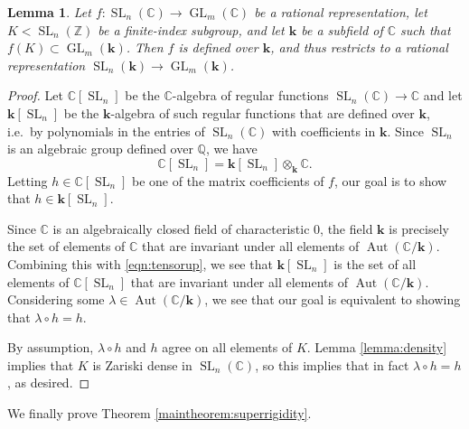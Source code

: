 \documentclass[11pt]{article}
\numberwithin{equation}{section}
\theoremstyle{plain}
\newtheorem{lemma}[theorem]{Lemma}
\theoremstyle{definition}
\theoremstyle{remark}
\DeclareMathOperator{\GL}{GL}
\DeclareMathOperator{\SL}{SL}
\newcommand\C{\ensuremath{\mathbb{C}}}
\newcommand\Z{\ensuremath{\mathbb{Z}}}
\newcommand\Q{\ensuremath{\mathbb{Q}}}
\DeclareMathOperator{\Aut}{Aut}
\newcommand\bk{\ensuremath{\mathbf{k}}}
\begin{document}
\begin{lemma}
\label{lemma:fieldofdef}
Let $f\colon \SL_n(\C) \rightarrow \GL_m(\C)$ be a rational representation, let
$K < \SL_n(\Z)$ be a finite-index subgroup, and let
$\bk$ be a subfield of $\C$ such that $f(K) \subset \GL_m(\bk)$.  Then
$f$ is defined over $\bk$, and thus restricts to a rational representation
$\SL_n(\bk) \rightarrow \GL_m(\bk)$.
\end{lemma}
\begin{proof}
Let $\C[\SL_n]$ be the $\C$-algebra of regular functions $\SL_n(\C) \rightarrow \C$ and
let $\bk[\SL_n]$ be the $\bk$-algebra of such regular functions that are
defined over $\bk$, i.e.\ by polynomials in the entries of $\SL_n(\C)$ with
coefficients in $\bk$.  Since $\SL_n$ is an algebraic group defined over $\Q$, we have
\begin{equation}
\label{eqn:tensorup}
\C[\SL_n] = \bk[\SL_n] \otimes_{\bk} \C.
\end{equation}
Letting $h \in \C[\SL_n]$ be one of the matrix coefficients of $f$, our goal
is to show that $h \in \bk[\SL_n]$.

Since $\C$ is an algebraically closed field of characteristic $0$, the field
$\bk$ is precisely the set of elements of $\C$ that are invariant under all elements
of $\Aut(\C/\bk)$.  Combining this with \eqref{eqn:tensorup}, we see
that $\bk[\SL_n]$ is the set of all elements of $\C[\SL_n]$ that
are invariant under all elements of $\Aut(\C/\bk)$.  Considering some
$\lambda \in \Aut(\C/\bk)$, we see that our goal is equivalent to showing
that $\lambda \circ h = h$.

By assumption, $\lambda \circ h$ and $h$ agree on all elements of $K$.
Lemma \ref{lemma:density} implies that $K$ is Zariski dense in $\SL_n(\C)$,
so this implies that in fact $\lambda \circ h = h$, as desired.
\end{proof}

We finally prove Theorem \ref{maintheorem:superrigidity}.
\end{document}
